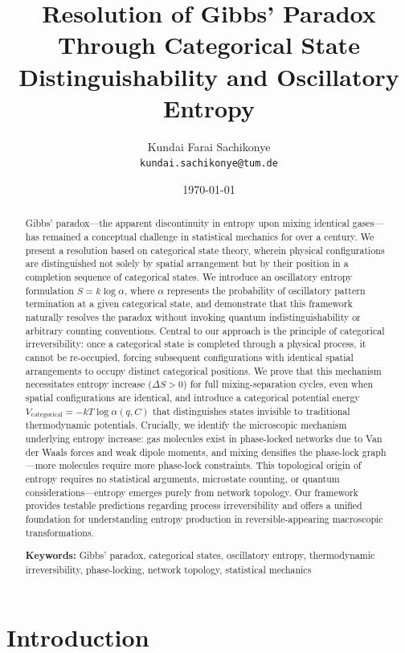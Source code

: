 \documentclass[12pt,a4paper]{article}
\title{Resolution of Gibbs' Paradox Through Categorical State Distinguishability and Oscillatory Entropy}
\author{
Kundai Farai Sachikonye\\
\texttt{kundai.sachikonye@tum.de}
}
\date{\today}
\theoremstyle{remark}
\begin{document}
\maketitle

\begin{abstract}
Gibbs' paradox—the apparent discontinuity in entropy upon mixing identical gases—has remained a conceptual challenge in statistical mechanics for over a century. We present a resolution based on categorical state theory, wherein physical configurations are distinguished not solely by spatial arrangement but by their position in a completion sequence of categorical states. We introduce an oscillatory entropy formulation $S = k \log \alpha$, where $\alpha$ represents the probability of oscillatory pattern termination at a given categorical state, and demonstrate that this framework naturally resolves the paradox without invoking quantum indistinguishability or arbitrary counting conventions. Central to our approach is the principle of categorical irreversibility: once a categorical state is completed through a physical process, it cannot be re-occupied, forcing subsequent configurations with identical spatial arrangements to occupy distinct categorical positions. We prove that this mechanism necessitates entropy increase ($\Delta S > 0$) for full mixing-separation cycles, even when spatial configurations are identical, and introduce a categorical potential energy $V_\text{categorical} = -kT \log \alpha(q, C)$ that distinguishes states invisible to traditional thermodynamic potentials. Crucially, we identify the microscopic mechanism underlying entropy increase: gas molecules exist in phase-locked networks due to Van der Waals forces and weak dipole moments, and mixing densifies the phase-lock graph—more molecules require more phase-lock constraints. This topological origin of entropy requires no statistical arguments, microstate counting, or quantum considerations—entropy emerges purely from network topology. Our framework provides testable predictions regarding process irreversibility and offers a unified foundation for understanding entropy production in reversible-appearing macroscopic transformations.

\textbf{Keywords:} Gibbs' paradox, categorical states, oscillatory entropy, thermodynamic irreversibility, phase-locking, network topology, statistical mechanics
\end{abstract}

\section{Introduction}
\end{document}
